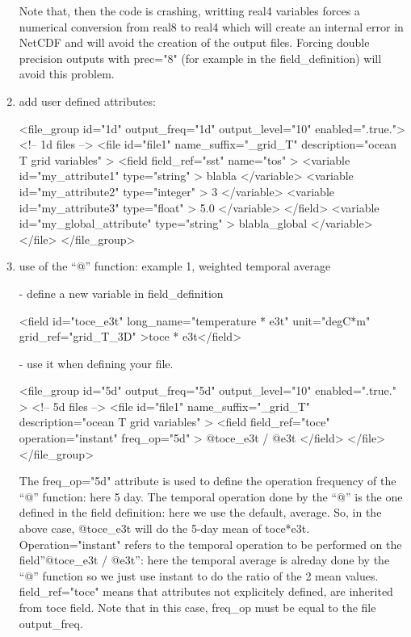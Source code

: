 \documentclass[../main/NEMO_manual]{subfiles}
\begin{document}
\begin{enumerate}
Note that, then the code is crashing, writting real4 variables forces a numerical conversion from
real8 to real4 which will create an internal error in NetCDF and will avoid the creation of the output files.
Forcing double precision outputs with prec="8" (for example in the field\_definition) will avoid this problem.

\item add user defined attributes:

\begin{xmllines}
<file_group id="1d" output_freq="1d" output_level="10" enabled=".true."> <!-- 1d files -->
	<file id="file1" name_suffix="_grid_T" description="ocean T grid variables" >
		<field field_ref="sst" name="tos" >
			<variable id="my_attribute1" type="string"  > blabla </variable>
			<variable id="my_attribute2" type="integer" > 3      </variable>
			<variable id="my_attribute3" type="float"   > 5.0    </variable>
		</field>
		<variable id="my_global_attribute" type="string" > blabla_global </variable>
	</file>
</file_group>
\end{xmllines}

\item use of the ``@'' function: example 1, weighted temporal average

 - define a new variable in field\_definition

\begin{xmllines}
<field id="toce_e3t" long_name="temperature * e3t" unit="degC*m" grid_ref="grid_T_3D" >toce * e3t</field>
\end{xmllines}

 - use it when defining your file.

\begin{xmllines}
<file_group id="5d" output_freq="5d"  output_level="10" enabled=".true." >  <!-- 5d files -->
	<file id="file1" name_suffix="_grid_T" description="ocean T grid variables" >
		<field field_ref="toce" operation="instant" freq_op="5d" > @toce_e3t / @e3t </field>
	</file>
</file_group>
\end{xmllines}

The freq\_op="5d" attribute is used to define the operation frequency of the ``@'' function: here 5 day.
The temporal operation done by the ``@'' is the one defined in the field definition:
here we use the default, average.
So, in the above case, @toce\_e3t will do the 5-day mean of toce*e3t.
Operation="instant" refers to the temporal operation to be performed on the field''@toce\_e3t / @e3t'':
here the temporal average is alreday done by the ``@'' function so we just use instant to do the ratio of
the 2 mean values.
field\_ref="toce" means that attributes not explicitely defined, are inherited from toce field.
Note that in this case, freq\_op must be equal to the file output\_freq.


\end{enumerate}
\end{document}
